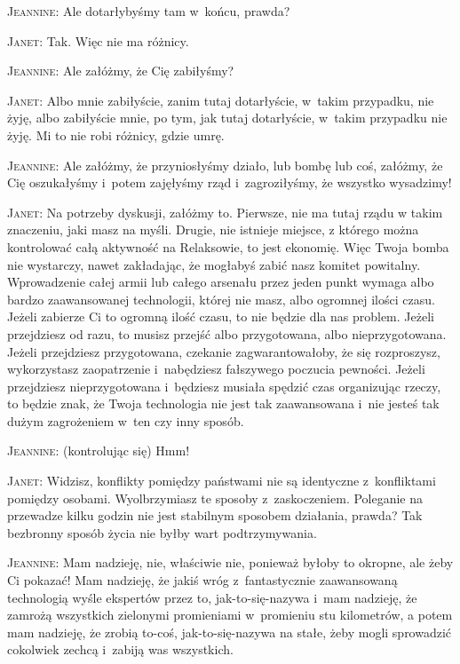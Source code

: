 \documentclass[oneside,polish,12pt,sfheadings]{mwbk}
\begin{document}
\textsc{Jeannine}: Ale dotarłybyśmy tam w~końcu, prawda?

\textsc{Janet}: Tak. Więc nie ma różnicy.

\textsc{Jeannine}: Ale załóżmy, że Cię zabiłyśmy?

\textsc{Janet}: Albo mnie zabiłyście, zanim tutaj dotarłyście, w~takim przypadku,
nie żyję, albo zabiłyście mnie, po tym, jak tutaj dotarłyście, w~takim
przypadku nie żyję. Mi to nie robi różnicy, gdzie umrę.

\textsc{Jeannine}: Ale załóżmy, że przyniosłyśmy działo, lub bombę lub coś,
załóżmy, że Cię oszukałyśmy i~potem zajęłyśmy rząd i~zagroziłyśmy,
że wszystko wysadzimy!

\textsc{Janet}: Na potrzeby dyskusji, załóżmy to. Pierwsze, nie ma tutaj rządu
w takim znaczeniu, jaki masz na myśli. Drugie, nie istnieje miejsce,
z którego można kontrolować całą aktywność na Relaksowie, to jest
ekonomię. Więc Twoja bomba nie wystarczy, nawet zakładając, że mogłabyś
zabić nasz komitet powitalny. Wprowadzenie całej armii lub całego
arsenału przez jeden punkt wymaga albo bardzo zaawansowanej technologii,
której nie masz, albo ogromnej ilości czasu. Jeżeli zabierze Ci to
ogromną ilość czasu, to nie będzie dla nas problem. Jeżeli przejdziesz
od razu, to musisz przejść albo przygotowana, albo nieprzygotowana.
Jeżeli przejdziesz przygotowana, czekanie zagwarantowałoby, że się
rozproszysz, wykorzystasz zaopatrzenie i~nabędziesz fałszywego poczucia
pewności. Jeżeli przejdziesz nieprzygotowana i~będziesz musiała spędzić
czas organizując rzeczy, to będzie znak, że Twoja technologia nie
jest tak zaawansowana i~nie jesteś tak dużym zagrożeniem w~ten czy
inny sposób.

\textsc{Jeannine}: (kontrolując się) Hmm!

\textsc{Janet}: Widzisz, konflikty pomiędzy państwami nie są identyczne z~konfliktami
pomiędzy osobami. Wyolbrzymiasz te sposoby z~zaskoczeniem. Poleganie
na przewadze kilku godzin nie jest stabilnym sposobem działania, prawda?
Tak bezbronny sposób życia nie byłby wart podtrzymywania.

\textsc{Jeannine}: Mam nadzieję, nie, właściwie nie, ponieważ byłoby to okropne,
ale żeby Ci pokazać! Mam nadzieję, że jakiś wróg z~fantastycznie zaawansowaną
technologią wyśle ekspertów przez to, jak-to-się-nazywa i~mam nadzieję,
że zamrożą wszystkich zielonymi promieniami w~promieniu stu kilometrów,
a potem mam nadzieję, że zrobią to-coś, jak-to-się-nazywa na stałe,
żeby mogli sprowadzić cokolwiek zechcą i~zabiją was wszystkich.
\end{document}
